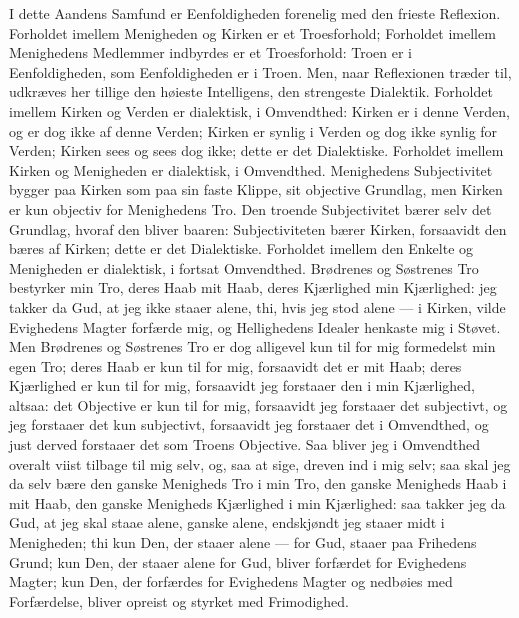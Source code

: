 \documentclass[12pt,a4paper]{book}
\newcommand{\opage}[1]{\marginnote{\footnotesize\textit{[#1]}}}
\begin{document}
I dette Aandens Samfund er Eenfoldigheden forenelig med den frieste Reflexion.
Forholdet imellem Menigheden og Kirken er et Troesforhold; Forholdet imellem
Menighedens Medlemmer indbyrdes er et Troesforhold: Troen er i Eenfoldigheden,
som Eenfoldigheden er i Troen. Men, naar Reflexionen træder til, udkræves her
tillige den høieste Intelligens, den strengeste Dialektik. Forholdet imellem
Kirken og Verden er dialektisk, i Omvendthed: Kirken er i denne Verden, og er
dog ikke af denne Verden; Kirken er synlig i Verden og dog ikke synlig for
Verden; Kirken sees og sees dog ikke; dette er det Dialektiske. Forholdet
imellem Kirken og Menigheden er dialektisk, i Omvendthed.
\opage{157} Menighedens Subjectivitet bygger paa Kirken som paa sin faste Klippe, sit
objective Grundlag, men Kirken er kun objectiv for Menighedens Tro. Den troende
Subjectivitet bærer selv det Grundlag, hvoraf den bliver baaren: Subjectiviteten
bærer Kirken, forsaavidt den bæres af Kirken; dette er det Dialektiske.
Forholdet imellem den Enkelte og Menigheden er dialektisk, i fortsat Omvendthed.
Brødrenes og Søstrenes Tro bestyrker min Tro, deres Haab mit Haab, deres
Kjærlighed min Kjærlighed: jeg takker da Gud, at jeg ikke staaer alene, thi,
hvis jeg stod alene --- i Kirken, vilde Evighedens Magter forfærde mig, og
Hellighedens Idealer henkaste mig i Støvet. Men Brødrenes og Søstrenes Tro er
dog alligevel kun til for mig formedelst min egen Tro; deres Haab er kun til for
mig, forsaavidt det er mit Haab; deres Kjærlighed er kun til for mig, forsaavidt
jeg forstaaer den i min Kjærlighed, altsaa: det Objective er kun til for mig,
forsaavidt jeg forstaaer det subjectivt, og jeg forstaaer det kun subjectivt,
forsaavidt jeg forstaaer det i Omvendthed, og just derved forstaaer det som
Troens Objective. Saa bliver jeg i Omvendthed overalt viist tilbage til mig
selv, og, saa at sige, dreven ind i mig selv; saa skal jeg da selv bære den
ganske Menigheds Tro i min Tro, den ganske Menigheds Haab i mit Haab, den ganske
Menigheds Kjærlighed i min Kjærlighed: saa takker jeg da Gud, at jeg skal staae
alene, ganske alene, endskjøndt jeg staaer midt i Menigheden; thi kun Den, der
staaer alene --- for Gud, staaer paa Frihedens Grund; kun Den, der staaer alene
for Gud, bliver forfærdet for Evighedens Magter; kun Den, der forfærdes for
Evighedens Magter og nedbøies med Forfærdelse, bliver opreist og styrket med
Frimodighed.
\end{document}
